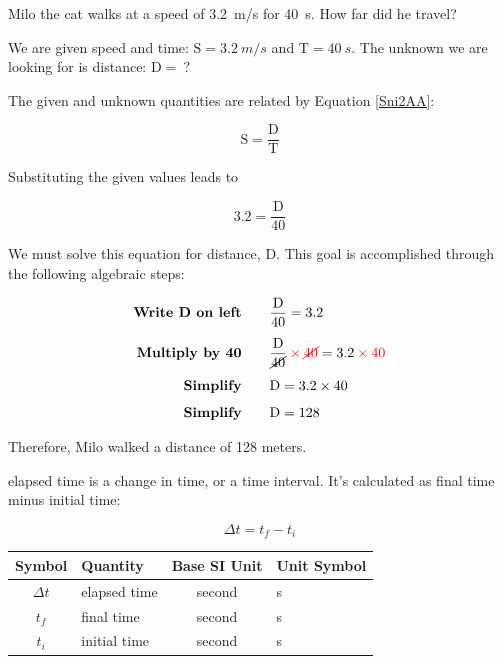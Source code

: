 \documentclass[main.tex]{subfiles}
\begin{document}
\solutionEnd

\begin{example}
    Milo the cat walks at a speed of \SI{3.2}{m/s} for \SI{40}{s}. How far did he travel?
\end{example}

\Solution We are given speed and time: $\mathrm{S} = \SI{3.2}{m/s}$ and $\text{T} = \SI{40}{s}$. The unknown we are looking for is distance: $\text{D} =\ ?$ 

\vspace{1em}

The given and unknown quantities are related by Equation \eqref{Sni2AA}:

\begin{equation*}
    \mathrm{S = \frac{D}{T}}
\end{equation*}

Substituting the given values leads to 

\begin{equation*}
    3.2 = \frac{\text{D}}{40}
\end{equation*}

We must solve this equation for distance, $\text{D}$. This goal is accomplished through the following algebraic steps:

\begin{align*}
    \textbf{Write $\text{D}$ on left}  \qquad & \frac{\text{D}}{40} = 3.2 \\[1ex]
    \textbf{Multiply by 40} \qquad & \frac{\text{D}}{\cancel{40}} \mathbin{\color{red} \times} \textcolor{red}{\cancel{40}} = 3.2 \mathbin{\color{red} \times} \textcolor{red}{40}\\[1ex]
    \textbf{Simplify} \qquad & \text{D} = 3.2 \times 40\\[1ex]
    \textbf{Simplify} \qquad & \mathrm{D} = 128
\end{align*}

Therefore, Milo walked a distance of 128 meters.

\solutionEnd

\vspace{1em}

\Gls{elapsed time} is a change in time, or a time interval. It's calculated as final time minus initial time:

\begin{equation}
    \Delta{t} = t_f - t_i
\end{equation}

\begin{center}
    \begin{tabular}{cl|cl}
    \hline
    \textbf{Symbol} & \textbf{Quantity} & \textbf{Base SI Unit} & \textbf{Unit Symbol}  \\
    \hline\hline
        $\Delta{t}$ & elapsed time & second & s\\
        $t_f$ & final time & second & s\\
        $t_i$ & initial time & second & s\\
    \hline
    \end{tabular}
\end{center}
\end{document}

